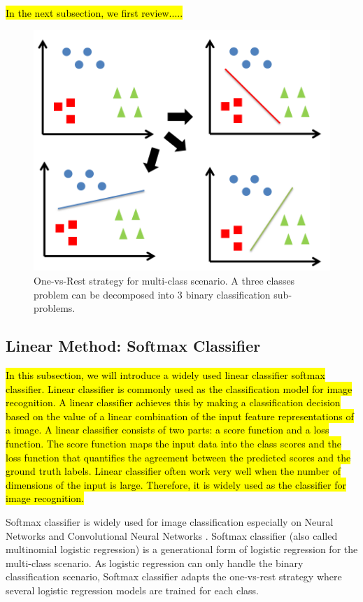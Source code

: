 \hl{In the next subsection, we first review.....}
\begin{figure}
	\centering
	\includegraphics[scale=.8]{relatedwork/fig/ovsa.png}
	\caption{One-vs-Rest strategy for multi-class scenario. A three classes problem can be decomposed into 3 binary classification sub-problems.}\label{fig:related:ovsa}
\end{figure}
\subsection{Linear Method: Softmax Classifier}
\hl{In this subsection, we will introduce a widely used linear classifier softmax classifier. Linear classifier is commonly used as the classification model for image recognition. A linear classifier achieves this by making a classification decision based on the value of a linear combination of the input feature representations of a image. A linear classifier consists of two parts: a score function and a loss function. The score function maps the input data into the class scores and the loss function that quantifies the agreement between the predicted scores and the ground truth labels. Linear classifier often work very well when the number of dimensions of the input is large. Therefore, it is widely used as the classifier for image recognition.} 

Softmax classifier is widely used for image classification especially on Neural Networks and Convolutional Neural Networks \cite{lecun1989backpropagation}.
Softmax classifier (also called multinomial logistic regression) is a generational form of logistic regression for the multi-class scenario. As logistic regression can only handle the binary classification scenario, Softmax classifier adapts the one-vs-rest strategy where several logistic regression models are trained for each class. 

